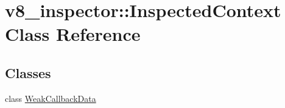 \hypertarget{classv8__inspector_1_1InspectedContext}{}\section{v8\+\_\+inspector\+:\+:Inspected\+Context Class Reference}
\label{classv8__inspector_1_1InspectedContext}
\subsection*{Classes}
\begin{DoxyCompactItemize}
\item 
class \mbox{\hyperlink{classv8__inspector_1_1InspectedContext_1_1WeakCallbackData}{Weak\+Callback\+Data}}
\end{DoxyCompactItemize}
